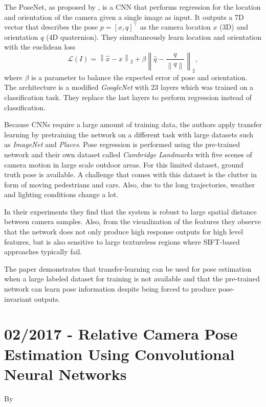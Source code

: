 			The PoseNet, as proposed by \cite{kendall2015posenet}, is a CNN that performs regression for the location and orientation of the camera given a single image as input.
			It outputs a 7D vector that describes the pose $p = [x, q]^\top$ as the camera location $x$ (3D) and orientation $q$ (4D quaternion).
			They simultaneously learn location and orientation with the euclidean loss
			\begin{equation}
				\mathcal{L}(I) = 
				\left\|
					\hat{x} - x 
				\right\|_2 
				+ \beta 
				\left\| 
					\hat{q} - \frac{q}{\left\| q \right\|} 
				\right\|_2,
			\end{equation}
			where $\beta$ is a parameter to balance the expected error of pose and orientation.
			The architecture is a modified \emph{GoogleNet} with 23 layers which was trained on a classification task.
			They replace the last layers to perform regression instead of classification.
			
			Because CNNs require a large amount of training data, the authors apply transfer learning by pretraining the network on a different task with large datasets such as \emph{ImageNet} and \emph{Places}.
			Pose regression is performed using the pre-trained network and their own dataset called \emph{Cambridge Landmarks} with five scenes of camera motion in large scale outdoor areas.
			For this limited dataset, ground truth pose is available.
			A challenge that comes with this dataset is the clutter in form of moving pedestrians and cars.
			Also, due to the long trajectories, weather and lighting conditions change a lot.
			
			In their experiments they find that the system is robust to large spatial distance between camera samples.
			Also, from the visualization of the features they observe that the network does not only produce high response outputs for high level features, but is also sensitive to large textureless regions where {SIFT}-based approaches typically fail.
			
			The paper demonstrates that transfer-learning can be used for pose estimation when a large labeled dataset for training is not available and that the pre-trained network can learn pose information despite being forced to produce pose-invariant outputs.
		
		\section{02/2017 - Relative Camera Pose Estimation Using Convolutional Neural Networks}
		
			By \cite{melekhov2017poseCNN}
			\\
		
		
		
		
		